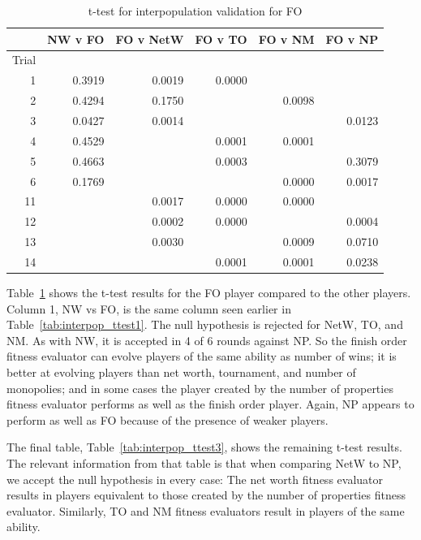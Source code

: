 \begin{table}[htbp]
  \centering
  \caption{t-test for interpopulation validation for FO}
    \begin{tabular}{rrrrrr}
    \toprule
          & NW v FO & FO v NetW & FO v TO & FO v NM & FO v NP \\
    \midrule
    Trial &       &       &       &       &  \\
    1     & 0.3919 & 0.0019 & 0.0000 &       &  \\
    2     & 0.4294 & 0.1750 &       & 0.0098 &  \\
    3     & 0.0427 & 0.0014 &       &       & 0.0123 \\
    4     & 0.4529 &       & 0.0001 & 0.0001 &  \\
    5     & 0.4663 &       & 0.0003 &       & 0.3079 \\
    6     & 0.1769 &       &       & 0.0000 & 0.0017 \\
    11    &       & 0.0017 & 0.0000 & 0.0000 &  \\
    12    &       & 0.0002 & 0.0000 &       & 0.0004 \\
    13    &       & 0.0030 &       & 0.0009 & 0.0710 \\
    14    &       &       & 0.0001 & 0.0001 & 0.0238 \\
    \bottomrule
    \end{tabular}%
  \label{tab:interpop_ttest2}%
\end{table}%

Table~\ref{tab:interpop_ttest2} shows the t-test results for the FO player
compared to the other players. Column 1, NW vs FO, is the same column seen
earlier in Table~\ref{tab:interpop_ttest1}. The null hypothesis is rejected for
NetW, TO, and NM. As with NW, it is accepted in 4 of 6 rounds against NP. So the
finish order fitness evaluator can evolve players of the same ability as number
of wins; it is better at evolving players than net worth, tournament, and number
of monopolies; and in some cases the player created by the number of properties
fitness evaluator performs as well as the finish order player. Again, NP appears
to perform as well as FO because of the presence of weaker players.

The final table, Table~\ref{tab:interpop_ttest3}, shows the remaining t-test
results. The relevant information from that table is that when comparing NetW to
NP, we accept the null hypothesis in every case: The net worth fitness evaluator
results in players equivalent to those created by the number of properties
fitness evaluator. Similarly, TO and NM fitness evaluators result in players of
the same ability. 

